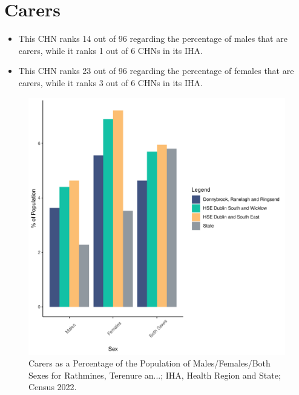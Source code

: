 \documentclass{article}
\begin{document}
\section{Carers}\label{sect:Carers}
\begin{itemize}
\item This CHN ranks  14 out of 96 regarding the percentage of males that are carers, while it ranks   1 out of 6 CHNs in its IHA.
\item This CHN ranks  23 out of 96 regarding the percentage of females that are carers, while it ranks   3 out of 6 CHNs in its IHA.
\end{itemize}
\begin{figure}[H]
	\centering
	\includegraphics[width = 150mm]{../figures/CareED.pdf}
	\caption{Carers as a Percentage of the Population of Males/Females/Both Sexes for Rathmines, Terenure an...; IHA, Health Region and State; Census 2022.}
	\label{fig:2ae19629-1a6a-13a3-e055-000000000001}
	\end{figure}
\end{document}
